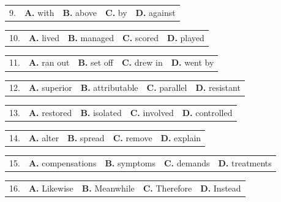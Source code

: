 \documentclass[UTF8,11pt]{ctexart}
\begin{document}
\noindent\begin{tabularx}{\linewidth}{@{}lXXXX@{}}9. & \textbf{A.} with & \textbf{B.} above & \textbf{C.} by & \textbf{D.} against\\\end{tabularx}\par

\noindent\begin{tabularx}{\linewidth}{@{}lXXXX@{}}10. & \textbf{A.} lived & \textbf{B.} managed & \textbf{C.} scored & \textbf{D.} played\\\end{tabularx}\par

\noindent\begin{tabularx}{\linewidth}{@{}lXXXX@{}}11. & \textbf{A.} ran out & \textbf{B.} set off & \textbf{C.} drew in & \textbf{D.} went by\\\end{tabularx}\par

\noindent\begin{tabularx}{\linewidth}{@{}lXXXX@{}}12. & \textbf{A.} superior & \textbf{B.} attributable & \textbf{C.} parallel & \textbf{D.} resistant\\\end{tabularx}\par

\noindent\begin{tabularx}{\linewidth}{@{}lXXXX@{}}13. & \textbf{A.} restored & \textbf{B.} isolated & \textbf{C.} involved & \textbf{D.} controlled\\\end{tabularx}\par

\noindent\begin{tabularx}{\linewidth}{@{}lXXXX@{}}14. & \textbf{A.} alter & \textbf{B.} spread & \textbf{C.} remove & \textbf{D.} explain\\\end{tabularx}\par

\noindent\begin{tabularx}{\linewidth}{@{}lXXXX@{}}15. & \textbf{A.} compensations & \textbf{B.} symptoms & \textbf{C.} demands & \textbf{D.} treatments\\\end{tabularx}\par

\noindent\begin{tabularx}{\linewidth}{@{}lXXXX@{}}16. & \textbf{A.} Likewise & \textbf{B.} Meanwhile & \textbf{C.} Therefore & \textbf{D.} Instead\\\end{tabularx}\par
\end{document}
